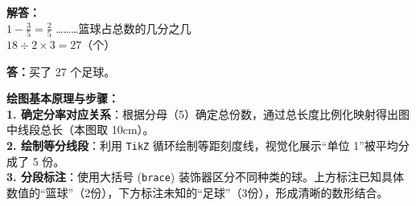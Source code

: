 \vspace{0.4cm}
\noindent\textbf{解答：}\\
\indent $1 - \frac{3}{5} = \frac{2}{5}$ \dots\dots\dots 篮球占总数的几分之几\\
\indent $18 \div 2 \times 3 = 27$（个）

\vspace{0.2cm}
\noindent\textbf{答：}买了 27 个足球。

\vspace{0.6cm}

{\small\color{blue!70!black}
\textbf{绘图基本原理与步骤：}\\
\textbf{1. 确定分率对应关系}：根据分母（5）确定总份数，通过总长度比例化映射得出图中线段总长（本图取 10cm）。\\
\textbf{2. 绘制等分线段}：利用 \texttt{TikZ} 循环绘制等距刻度线，视觉化展示“单位 1”被平均分成了 5 份。\\
\textbf{3. 分段标注}：使用大括号 (\texttt{brace}) 装饰器区分不同种类的球。上方标注已知具体数值的“篮球”（2份），下方标注未知的“足球”（3份），形成清晰的数形结合。
}

\newpage
